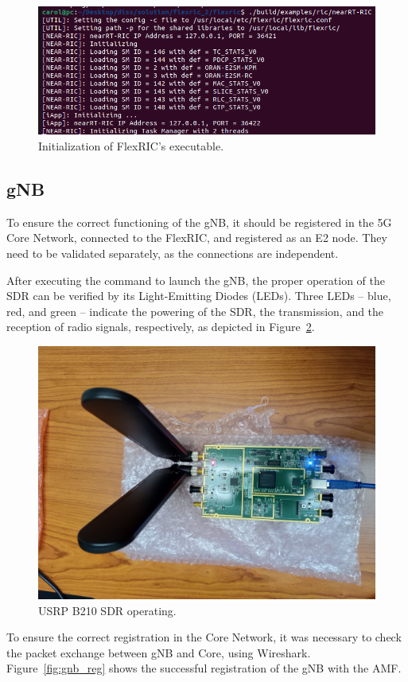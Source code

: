 \begin{figure}[H]
    \centering
    \includegraphics[width=0.7\linewidth]{figures/flexric_init}
    \caption{Initialization of FlexRIC's executable.}
    \label{fig:near-rt-ric}
\end{figure}

\subsection{gNB}\label{subsec:gnb}
To ensure the correct functioning of the gNB, it should be registered in the 5G Core Network, connected to the FlexRIC, and registered as an E2 node.
They need to be validated separately, as the connections are independent.

After executing the command to launch the gNB\@, the proper operation of the SDR can be verified by its Light-Emitting Diodes (LEDs).
Three LEDs  -- blue, red, and green -- indicate the powering of the SDR, the transmission, and the reception of radio signals, respectively, as depicted in Figure~\ref{fig:usrp_working}.

\begin{figure}[H]
    \centering
    \includegraphics[width=0.5\linewidth]{figures/usrp_working}
    \caption[USRP B210 SDR operating]{USRP B210 SDR operating.}
    \label{fig:usrp_working}
\end{figure}

To ensure the correct registration in the Core Network, it was necessary to check the packet exchange between gNB and Core, using Wireshark.
Figure~\ref{fig:gnb_reg} shows the successful registration of the gNB with the AMF\@.

